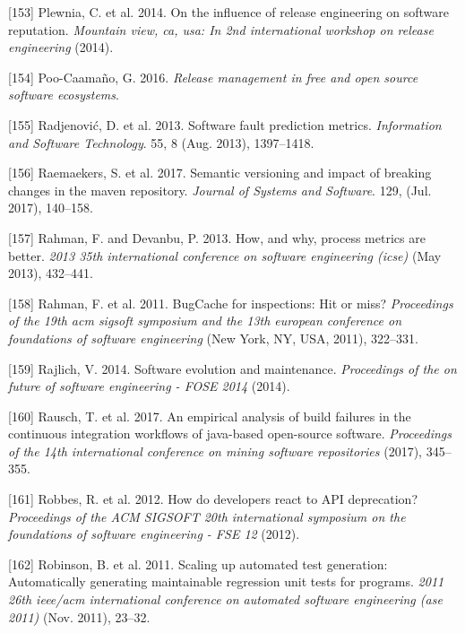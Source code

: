 \documentclass[]{book}
\begin{document}
\hypertarget{ref-plewnia2014a}{}
{[}153{]} Plewnia, C. et al. 2014. On the influence of release
engineering on software reputation. \emph{Mountain view, ca, usa: In 2nd
international workshop on release engineering} (2014).

\hypertarget{ref-poo-caamano2016a}{}
{[}154{]} Poo-Caamaño, G. 2016. \emph{Release management in free and
open source software ecosystems}.

\hypertarget{ref-Radjenovic2013}{}
{[}155{]} Radjenović, D. et al. 2013. Software fault prediction metrics.
\emph{Information and Software Technology}. 55, 8 (Aug. 2013),
1397--1418.

\hypertarget{ref-Raemaekers2017}{}
{[}156{]} Raemaekers, S. et al. 2017. Semantic versioning and impact of
breaking changes in the maven repository. \emph{Journal of Systems and
Software}. 129, (Jul. 2017), 140--158.

\hypertarget{ref-Rahman2013}{}
{[}157{]} Rahman, F. and Devanbu, P. 2013. How, and why, process metrics
are better. \emph{2013 35th international conference on software
engineering (icse)} (May 2013), 432--441.

\hypertarget{ref-rahman2011}{}
{[}158{]} Rahman, F. et al. 2011. BugCache for inspections: Hit or miss?
\emph{Proceedings of the 19th acm sigsoft symposium and the 13th
european conference on foundations of software engineering} (New York,
NY, USA, 2011), 322--331.

\hypertarget{ref-Rajlich2014}{}
{[}159{]} Rajlich, V. 2014. Software evolution and maintenance.
\emph{Proceedings of the on future of software engineering - FOSE 2014}
(2014).

\hypertarget{ref-rausch2017empirical}{}
{[}160{]} Rausch, T. et al. 2017. An empirical analysis of build
failures in the continuous integration workflows of java-based
open-source software. \emph{Proceedings of the 14th international
conference on mining software repositories} (2017), 345--355.

\hypertarget{ref-Robbes2012}{}
{[}161{]} Robbes, R. et al. 2012. How do developers react to API
deprecation? \emph{Proceedings of the ACM SIGSOFT 20th international
symposium on the foundations of software engineering - FSE 12} (2012).

\hypertarget{ref-robinson2011}{}
{[}162{]} Robinson, B. et al. 2011. Scaling up automated test
generation: Automatically generating maintainable regression unit tests
for programs. \emph{2011 26th ieee/acm international conference on
automated software engineering (ase 2011)} (Nov. 2011), 23--32.
\end{document}

